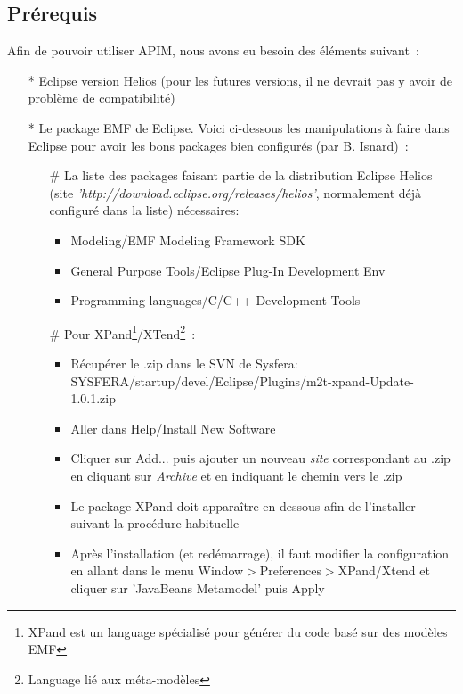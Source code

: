 \documentclass{article}
\begin{document}
\subsection*{Pr\'erequis}
Afin de pouvoir utiliser APIM, nous avons eu besoin des \'el\'ements suivant~:
\begin{itemize}
\item[*] Eclipse version Helios (pour les futures versions, il ne devrait pas y avoir de probl\`eme de compatibilit\'e)
\item[*] Le package EMF de Eclipse. Voici ci-dessous les manipulations \`a faire dans Eclipse pour avoir les bons packages bien configur\'es (par B. Isnard)~:
  \begin{itemize}
  \item[\#] La liste des packages faisant partie de la distribution Eclipse Helios (site \textit{'http://download.eclipse.org/releases/helios'}, normalement d\'ej\`a configur\'e dans la liste) n\'ecessaires:
    \begin{itemize}
      \item Modeling/EMF Modeling Framework SDK
      \item General Purpose Tools/Eclipse Plug-In Development Env
      \item Programming languages/C/C++ Development Tools
    \end{itemize}
  \item[\#] Pour XPand\footnote{XPand est un language sp\'ecialis\'e pour g\'en\'erer du code bas\'e sur des mod\`eles EMF}/XTend\footnote{Language li\'e aux m\'eta-mod\`eles}~:
    \begin{itemize}
    \item R\'ecup\'erer le .zip dans le SVN de Sysfera: SYSFERA/startup/devel/Eclipse\-/Plugins/m2t-xpand-Update-1.0.1.zip
    \item Aller dans Help/Install New Software
    \item Cliquer sur Add... puis ajouter un nouveau \textit{site} correspondant au .zip en cliquant sur \textit{Archive} et en indiquant le chemin vers le .zip
    \item Le package XPand doit appara\^itre en-dessous afin de l'installer suivant la proc\'edure habituelle
    \item Après l'installation (et red\'emarrage), il faut modifier la configuration en allant dans le menu Window$>$Preferences$>$XPand/Xtend et cliquer sur 'JavaBeans Metamodel' puis Apply
    \end{itemize}


\end{itemize}
\end{itemize}
\end{document}
